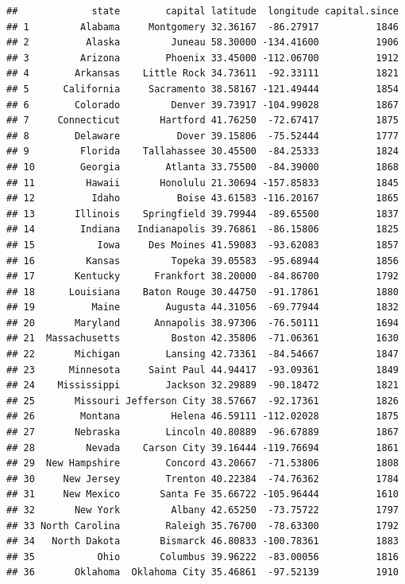 \documentclass[
]{article}
\begin{document}
\begin{verbatim}
##             state        capital latitude  longitude capital.since
## 1         Alabama     Montgomery 32.36167  -86.27917          1846
## 2          Alaska         Juneau 58.30000 -134.41600          1906
## 3         Arizona        Phoenix 33.45000 -112.06700          1912
## 4        Arkansas    Little Rock 34.73611  -92.33111          1821
## 5      California     Sacramento 38.58167 -121.49444          1854
## 6        Colorado         Denver 39.73917 -104.99028          1867
## 7     Connecticut       Hartford 41.76250  -72.67417          1875
## 8        Delaware          Dover 39.15806  -75.52444          1777
## 9         Florida    Tallahassee 30.45500  -84.25333          1824
## 10        Georgia        Atlanta 33.75500  -84.39000          1868
## 11         Hawaii       Honolulu 21.30694 -157.85833          1845
## 12          Idaho          Boise 43.61583 -116.20167          1865
## 13       Illinois    Springfield 39.79944  -89.65500          1837
## 14        Indiana   Indianapolis 39.76861  -86.15806          1825
## 15           Iowa     Des Moines 41.59083  -93.62083          1857
## 16         Kansas         Topeka 39.05583  -95.68944          1856
## 17       Kentucky      Frankfort 38.20000  -84.86700          1792
## 18      Louisiana    Baton Rouge 30.44750  -91.17861          1880
## 19          Maine        Augusta 44.31056  -69.77944          1832
## 20       Maryland      Annapolis 38.97306  -76.50111          1694
## 21  Massachusetts         Boston 42.35806  -71.06361          1630
## 22       Michigan        Lansing 42.73361  -84.54667          1847
## 23      Minnesota     Saint Paul 44.94417  -93.09361          1849
## 24    Mississippi        Jackson 32.29889  -90.18472          1821
## 25       Missouri Jefferson City 38.57667  -92.17361          1826
## 26        Montana         Helena 46.59111 -112.02028          1875
## 27       Nebraska        Lincoln 40.80889  -96.67889          1867
## 28         Nevada    Carson City 39.16444 -119.76694          1861
## 29  New Hampshire        Concord 43.20667  -71.53806          1808
## 30     New Jersey        Trenton 40.22384  -74.76362          1784
## 31     New Mexico       Santa Fe 35.66722 -105.96444          1610
## 32       New York         Albany 42.65250  -73.75722          1797
## 33 North Carolina        Raleigh 35.76700  -78.63300          1792
## 34   North Dakota       Bismarck 46.80833 -100.78361          1883
## 35           Ohio       Columbus 39.96222  -83.00056          1816
## 36       Oklahoma  Oklahoma City 35.46861  -97.52139          1910

\end{verbatim}
\end{document}
